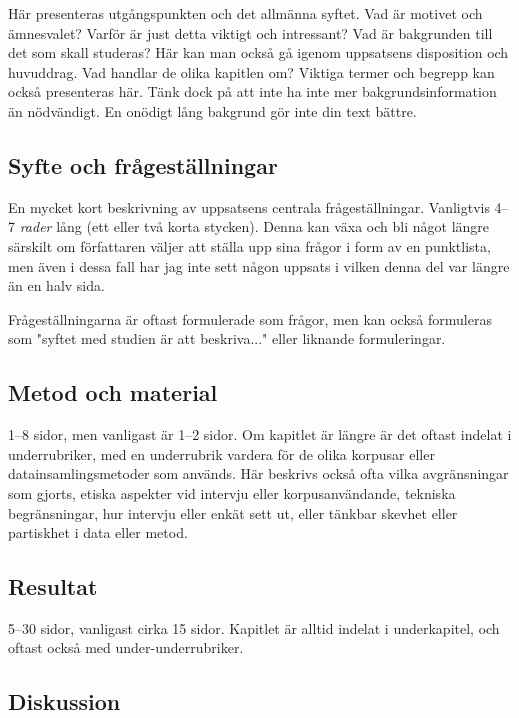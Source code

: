 Här presenteras utgångspunkten och det allmänna syftet. Vad är motivet och
ämnesvalet? Varför är just detta viktigt och intressant? Vad är bakgrunden till
det som skall studeras? Här kan man också gå igenom uppsatsens disposition och
huvuddrag. Vad handlar de olika kapitlen om? Viktiga termer och begrepp kan
också presenteras här. Tänk dock på att inte ha inte mer bakgrundsinformation
än nödvändigt. En onödigt lång bakgrund gör inte din text bättre.


\subsection{Syfte och frågeställningar}
\label{rubrik.syfte}

En mycket kort beskrivning av uppsatsens centrala frågeställningar. Vanligtvis
4–7 \emph{rader} lång (ett eller två korta stycken). Denna kan växa och bli
något längre särskilt om författaren väljer att ställa upp sina frågor i form
av en punktlista, men även i dessa fall har jag inte sett någon uppsats i
vilken denna del var längre än en halv sida.

Frågeställningarna är oftast formulerade som frågor, men kan också formuleras
som "syftet med studien är att beskriva..." eller liknande formuleringar.


\subsection{Metod och material}
\label{rubrik.metod}

1--8 sidor, men vanligast är 1--2 sidor. Om kapitlet är längre är det oftast
indelat i underrubriker, med en underrubrik vardera för de olika korpusar eller
datainsamlingsmetoder som används. Här beskrivs också ofta vilka avgränsningar
som gjorts, etiska aspekter vid intervju eller korpusanvändande, tekniska
begränsningar, hur intervju eller enkät sett ut, eller tänkbar skevhet eller
partiskhet i data eller metod.


\subsection{Resultat}
\label{rubrik.resultat}

5--30 sidor, vanligast cirka 15 sidor. Kapitlet är alltid indelat i
underkapitel, och oftast också med under-underrubriker.


\subsection{Diskussion}
\label{rubrik.diskussion}

